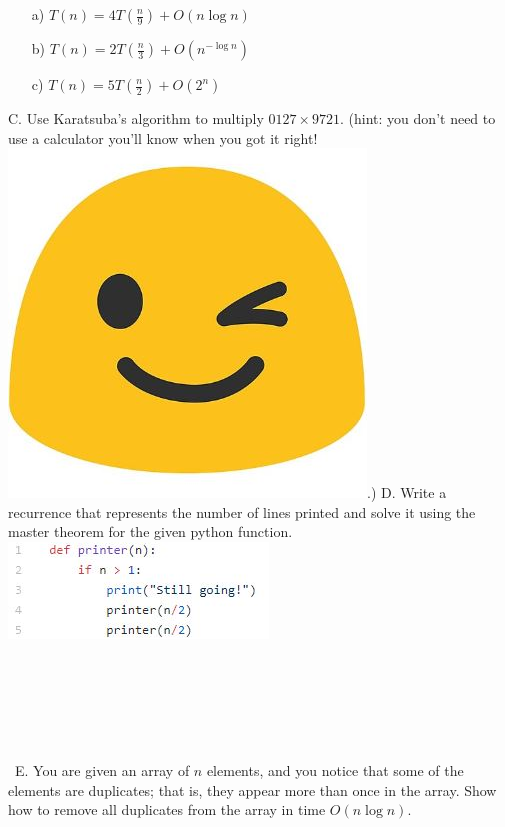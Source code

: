 \documentclass[12pt]{article}
\begin{document}
\begin{enumerate}
    \item[a)]$T(n) = 4T(\frac{n}{9}) + O(n \log{n})$
    \item[b)]$T(n) = 2T(\frac{n}{3}) + O(n^{-\log{n}})$
    \item[c)]$T(n) = 5T(\frac{n}{2}) + O(2^n)$
\end{enumerate}
\newpage
\noindent C. Use Karatsuba's algorithm to multiply $0127\times9721$. (hint: you don't need to use a calculator you'll know when you got it right! \includegraphics[scale = 0.05]{wink.jpg}.)
\newpage
\noindent D. Write a recurrence that represents the number of lines printed and solve it using the master theorem for the given python function.\\
\includegraphics{printer.jpg}\\\\\\\\\\\\\\\
\noindent E. You are given an array of $n$ elements, and you notice that 
some of the elements are duplicates; that is, they appear more 
than once in the array. Show how to remove all duplicates from 
the array in time $O(n \log{n})$.\\\\\\\\\\\\\\\\\\\\\\\\\\\
\end{document}
